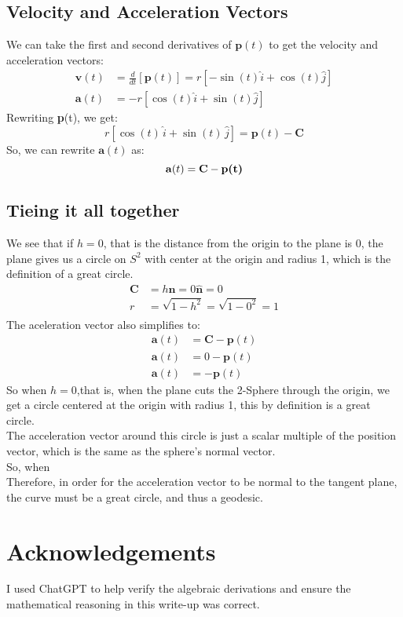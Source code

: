 \documentclass[11pt]{article}
\begin{document}
\subsection*{Velocity and Acceleration Vectors}
We can take the first and second derivatives of $\textbf{p}(t)$ to get the velocity and acceleration vectors:
\begin{align*}
    \mathbf{v}(t) & = \frac{d}{dt} \left[\textbf{p}(t)\right] =  r\left[-\sin(t) \hat{i} + \cos(t) \hat{j} \right]\\                                                               
          \mathbf{a}(t) &= -r[\cos(t)\hat{i} + \sin(t)\hat{j}] 
\end{align*}
Rewriting \textbf{p}(t), we get:
$$r[\cos(t)\,\hat{i} + \sin(t)\,\hat{j}] = \textbf{p}(t) - \mathbf{C}$$
So, we can rewrite $\mathbf{a}(t)$ as:
$$\mathbf{a}(t) = \mathbf{C} - \textbf{\textbf{p}(t)}$$
\newpage
\subsection*{Tieing it all together}
We see that if $h = 0$, that is the distance from the origin to the plane is 0, the plane gives us a circle on $S^2$ with center at the origin and radius 1, which is the definition of a great circle.
\begin{align*}
    \mathbf{C} &= h \hat{\textbf{n}} = 0 \hat{\textbf{n}} = 0  \\[1ex]
    r &= \sqrt{1- h^2} = \sqrt{1- 0^2} = 1      \\
\end{align*}
The aceleration vector also simplifies to:
\begin{align*}
    \mathbf{a}(t) & = \mathbf{C} - \textbf{p}(t) \\
    \mathbf{a}(t) & = 0 - \textbf{p}(t) \\
    \mathbf{a}(t) & = - \textbf{p}(t)
\end{align*}
So when $h = 0$,that is, when the plane cuts the 2-Sphere through the origin, we get a circle centered at the origin with radius 1, this by definition is a great circle. \\
The acceleration vector around this circle is just a scalar multiple of the position vector, which is the same as the sphere's normal vector. \\
So, when     \\[1ex]
Therefore, in order for the acceleration vector to be normal to the tangent plane, the curve must be a great circle, and thus a geodesic.
\pagebreak
\section*{Acknowledgements}
I used ChatGPT to help verify the algebraic derivations and ensure the mathematical reasoning in this write-up was correct.
\end{document}
